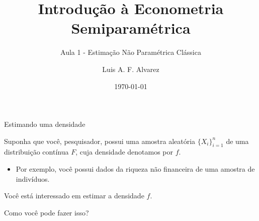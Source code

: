 \documentclass[11pt]{beamer}
\author{Luis A. F. Alvarez}
\title{Introdução à Econometria Semiparamétrica}
\subtitle{Aula 1 - Estimação Não Paramétrica Clássica}
\date{\today}
\newenvironment{halfwideitemize}{\itemize\addtolength{\itemsep}{0.5em}}{\enditemize}
\begin{document}
	\begin{frame}[plain]
	\maketitle
	\end{frame}
	\begin{frame}{Estimando uma densidade}
		\begin{halfwideitemize}
			\item Suponha que você, pesquisador, possui uma amostra aleatória $\{X_i\}_{i=1}^n$ de uma distribuição contínua $F$, cuja densidade denotamos por $f$.
			\begin{itemize}
				\item Por exemplo, você possui dados da riqueza não financeira de uma amostra de indivíduos.
			\end{itemize}
			\item Você está interessado em estimar a densidade $f$.
			\item Como você pode fazer isso?
		\end{halfwideitemize}
	\end{frame}
	
\end{document}

